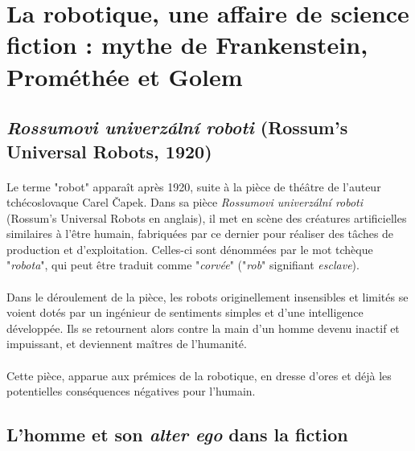 \documentclass[a4paper,10pt]{article}
\begin{document}
    \section{La robotique, une affaire de science fiction : mythe de Frankenstein, Prométhée et Golem} 
        \subsection{\textit{Rossumovi univerzální roboti} (Rossum's Universal Robots, 1920)}
            
            \paragraph{}
                Le terme "robot" apparaît après 1920, suite à la pièce de théâtre 
                de l'auteur tchécoslovaque Carel Čapek. Dans sa pièce \textit{Rossumovi univerzální roboti}
                (Rossum's Universal Robots en anglais), il met en scène des créatures artificielles
                similaires à l'être humain, fabriquées par ce dernier pour réaliser des tâches 
                de production et d'exploitation. Celles-ci sont dénommées par le mot tchèque "\textit{robota}", 
                qui peut être traduit comme "\textit{corvée}" ("\textit{rob}" signifiant \textit{esclave}). 
                
            
            
            \paragraph{}
                Dans le déroulement de la pièce, les robots originellement insensibles et limités se voient 
                dotés par un ingénieur de sentiments simples et d'une intelligence développée. 
                Ils se retournent alors contre la main d'un homme devenu inactif et impuissant, et 
                deviennent maîtres de l'humanité. 
                
            \paragraph{}
                Cette pièce, apparue aux prémices de la robotique, en dresse d'ores et déjà les potentielles 
                conséquences négatives pour l'humain. 
                
        \subsection{L'homme et son \textit{alter ego} dans la fiction} 
\end{document}
